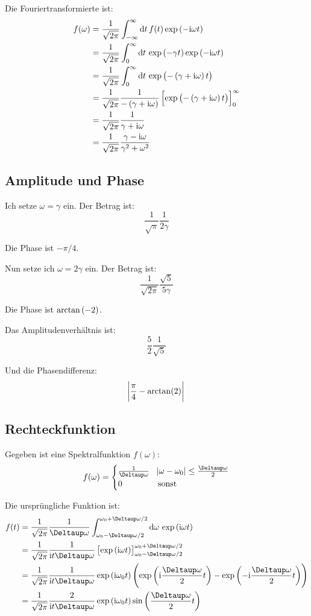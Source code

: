 Die Fouriertransformierte ist:
\begin{align*}
	f(\omega)
	&= \frac{1}{\sqrt{2 \pi}} \int_{-\infty}^\infty \dif t \, f(t) \exp\del{-\ii \omega t} \\
	&= \frac{1}{\sqrt{2 \pi}} \int_0^\infty \dif t \, \exp\del{-\gamma t} \exp\del{-\ii \omega t} \\
	&= \frac{1}{\sqrt{2 \pi}} \int_0^\infty \dif t \, \exp\del{-\del{\gamma + \ii \omega} t} \\
	&= \frac{1}{\sqrt{2 \pi}} \frac{1}{-\del{\gamma + \ii \omega}} \sbr{\exp\del{-\del{\gamma + \ii \omega} t}}_0^\infty \\
	&= \frac{1}{\sqrt{2 \pi}} \frac{1}{\gamma + \ii \omega} \\
	&= \frac{1}{\sqrt{2 \pi}} \frac{\gamma - \ii \omega}{\gamma^2 + \omega^2} \\
\end{align*}

\subsection{Amplitude und Phase}

Ich setze $\omega = \gamma$ ein. Der Betrag ist:
\[
	\frac{1}{\sqrt{\pi}} \frac{1}{2 \gamma}
\]

Die Phase ist $- \pi / 4$.

Nun setze ich $\omega = 2 \gamma$ ein. Der Betrag ist:
\[
	\frac{1}{\sqrt{2 \pi}} \frac{\sqrt{5}}{5 \gamma}
\]

Die Phase ist $\arctan\del{-2}$.

Das Amplitudenverhältnis ist:
\[
	\frac 52 \frac{1}{\sqrt{5}}
\]

Und die Phasendifferenz:
\[
	\abs{\frac \pi4 - \arctan(2)}
\]

\subsection{Rechteckfunktion}

Gegeben ist eine Spektralfunktion $f(\omega)$:
\[
	f(\omega) = \begin{cases}
		\frac 1{\Deltaup \omega} & \abs{\omega - \omega_0} \leq \frac{\Deltaup \omega}2 \\
											  0 & \text{sonst}
	\end{cases}
\]

Die ursprüngliche Funktion ist:
\begin{align*}
	f(t)
	&= \frac{1}{\sqrt{2\pi}} \frac{1}{\Deltaup \omega} \int_{\omega_0 - \Deltaup \omega/2}^{\omega_0 + \Deltaup \omega/2} \dif \omega \, \exp\del{\ii \omega t} \\
	&= \frac{1}{\sqrt{2\pi}} \frac{1}{\ii t \Deltaup \omega} \sbr{\exp\del{\ii \omega t}}_{\omega_0 - \Deltaup \omega/2}^{\omega_0 + \Deltaup \omega/2} \\
	&= \frac{1}{\sqrt{2\pi}} \frac{1}{\ii t \Deltaup \omega} \exp\del{\ii \omega_0 t} \del{\exp\del{\ii \frac{\Deltaup \omega}2 t} - \exp\del{-\ii \frac{\Deltaup \omega}2 t}} \\
	&= \frac{1}{\sqrt{2\pi}} \frac{2}{\ii t \Deltaup \omega} \exp\del{\ii \omega_0 t} \sin\del{\frac{\Deltaup \omega}2 t}
\end{align*}

